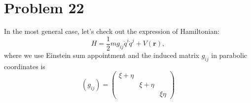 \section*{Problem 22}

In the most general case, let's check out the expression of Hamiltonian:
\begin{equation*}
    H = \frac{1}{2} m g_{ij} \dot{q}^i \dot{q}^j  +  V\left(\boldsymbol{r}\right),
\end{equation*}
where we use Einstein sum appointment and the induced matrix $g_{ij}$ in parabolic coordinates is
\begin{equation}
    \left(g_{ij}\right)  = \left(
    \begin{matrix}
        \xi + \eta  &               &           \\
                    & \xi + \eta    &           \\
                    &               &  \xi\eta
    \end{matrix}
    \right)
\end{equation}